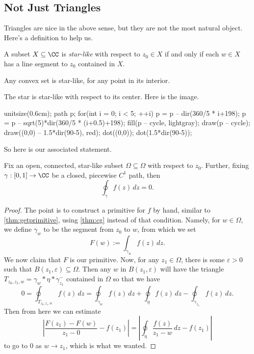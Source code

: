 \subsection{Not Just Triangles}
Triangles are nice in the above sense, but they are not the most natural object. Here's a definition to help us.
\begin{definition}
	A subset $X\subseteq\CC$ is \textit{star-like} with respect to $z_0\in X$ if and only if each $w\in X$ has a line segment to $z_0$ contained in $X$.
\end{definition}
\begin{example}
	Any convex set is star-like, for any point in its interior.
\end{example}
\begin{ex}
	The star is star-like with respect to its center. Here is the image.
	\begin{center}
		\begin{asy}
			unitsize(0.6cm);
			path p;
			for(int i = 0; i < 5; ++i)
			{
				p = p -- dir(360/5 * i+198);
				p = p -- sqrt(5)*dir(360/5 * (i+0.5)+198);
			}
			fill(p -- cycle, lightgray);
			draw(p -- cycle);
			draw((0,0) -- 1.5*dir(90-5), red);
			dot((0,0));
			dot(1.5*dir(90-5));
		\end{asy}
	\end{center}
\end{ex}
So here is our associated statement.
\begin{theorem}
	Fix an open, connected, star-like subset $\Omega\subseteq\Omega$ with respect to $z_0$. Further, fixing $\gamma:[0,1]\to\CC$ be a closed, piecewise $C^1$ path, then
	\[\oint_\gamma f(z)\,dz=0.\]
\end{theorem}
\begin{proof}
	The point is to construct a primitive for $f$ by hand, similar to \autoref{thm:getprimitive}, using \autoref{thm:cg} instead of that condition. Namely, for $w\in\Omega$, we define $\gamma_w$ to be the segment from $z_0$ to $w$, from which we set
	\[F(w):=\int_{\gamma_w}f(z)\,dz.\]
	We now claim that $F$ is our primitive. Now, for any $z_1\in\Omega$, there is some $\varepsilon>0$ such that $B(z_1,\varepsilon)\subseteq\Omega$. Then any $w$ in $B(z_1,\varepsilon)$ will have the triangle $T_{z_0,z_1,w}=\gamma_w*\eta*\gamma_{z_1}^-$ contained in $\Omega$ %
	so that we have
	\[0=\oint_{T_{z_0,z_1,w}}f(z)\,dz=\oint_{\gamma_w}f(z)\,dz+\oint_\eta f(z)\,dz-\oint_{\gamma_{z_1}}f(z)\,dz.\]
	Then from here we can estimate
	\[\left|\frac{F(z_1)-F(w)}{z_1-0}-f(z_1)\right|=\left|\oint_\eta\frac{f(z)}{z_1-w}\,dz-f(z_1)\right|\]
	to go to $0$ as $w\to z_1$, which is what we wanted.
\end{proof}